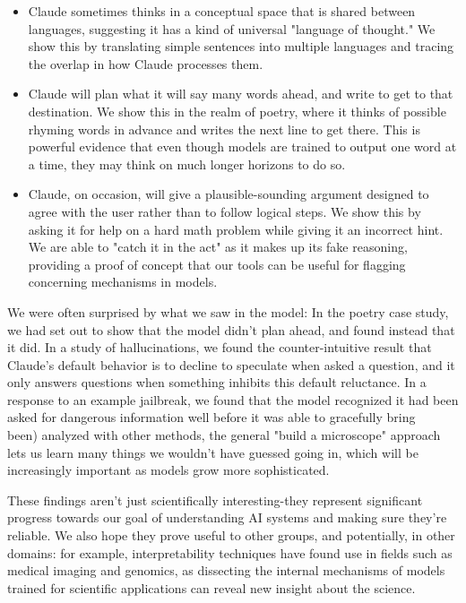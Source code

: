\documentclass[10pt]{article}
\begin{document}
\begin{itemize}
  \item Claude sometimes thinks in a conceptual space that is shared between languages, suggesting it has a kind of universal "language of thought." We show this by translating simple sentences into multiple languages and tracing the overlap in how Claude processes them.
  \item Claude will plan what it will say many words ahead, and write to get to that destination. We show this in the realm of poetry, where it thinks of possible rhyming words in advance and writes the next line to get there. This is powerful evidence that even though models are trained to output one word at a time, they may think on much longer horizons to do so.
  \item Claude, on occasion, will give a plausible-sounding argument designed to agree with the user rather than to follow logical steps. We show this by asking it for help on a hard math problem while giving it an incorrect hint. We are able to "catch it in the act" as it makes up its fake reasoning, providing a proof of concept that our tools can be useful for flagging concerning mechanisms in models.
\end{itemize}

We were often surprised by what we saw in the model: In the poetry case study, we had set out to show that the model didn't plan ahead, and found instead that it did. In a study of hallucinations, we found the counter-intuitive result that Claude's default behavior is to decline to speculate when asked a question, and it only answers questions when something inhibits this default reluctance. In a response to an example jailbreak, we found that the model recognized it had been asked for dangerous information well before it was able to gracefully bring\\
been) analyzed with other methods, the general "build a microscope" approach lets us learn many things we wouldn't have guessed going in, which will be increasingly important as models grow more sophisticated.

These findings aren't just scientifically interesting-they represent significant progress towards our goal of understanding AI systems and making sure they're reliable. We also hope they prove useful to other groups, and potentially, in other domains: for example, interpretability techniques have found use in fields such as medical imaging and genomics, as dissecting the internal mechanisms of models trained for scientific applications can reveal new insight about the science.
\end{document}
